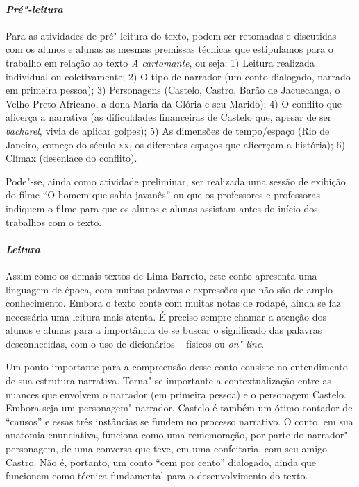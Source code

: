 \documentclass[11pt]{extarticle}
\begin{document}
{{\paragraph{\textit{Pré"-leitura}}

Para as atividades de pré"-leitura do texto, podem ser retomadas e
discutidas com os alunos e alunas as mesmas premissas técnicas que
estipulamos para o trabalho em relação ao texto {\textit{A
cartomante}}, ou seja: 1) Leitura realizada individual ou coletivamente;
2) O tipo de narrador (um conto dialogado, narrado em primeira pessoa);
3) Personagens (Castelo, Castro, Barão de Jacuecanga, o Velho Preto
Africano, a dona Maria da Glória e seu Marido); 4) O conflito que
alicerça a narrativa (as dificuldades financeiras de Castelo que, apesar
de ser \emph{bacharel}, vivia de aplicar golpes); 5) As dimensões de
tempo/espaço (Rio de Janeiro, começo do século \textsc{xx}, os diferentes espaços
que alicerçam a história); 6) Clímax (desenlace do conflito).

Pode"-se, ainda como atividade preliminar, ser realizada uma sessão de
exibição do filme ``O homem que sabia javanês'' ou que os professores e
professoras indiquem o filme para que os alunos e alunas assistam antes
do início dos trabalhos com o texto.

\paragraph{\textit{Leitura}}

Assim como os demais textos de Lima Barreto, este conto apresenta uma
linguagem de época, com muitas palavras e expressões que não são de
amplo conhecimento. Embora o texto conte com muitas notas de rodapé,
ainda se faz necessária uma leitura mais atenta. É preciso sempre chamar
a atenção dos alunos e alunas para a importância de se buscar o
significado das palavras desconhecidas, com o uso de dicionários --
físicos ou ­\emph{on"-line}.

Um ponto importante para a compreensão desse conto consiste no
entendimento de sua estrutura narrativa. Torna"-se importante a
contextualização entre as nuances que envolvem o narrador (em primeira
pessoa) e o personagem Castelo. Embora seja um personagem"-narrador,
Castelo é também um ótimo contador de ``causos'' e essas três instâncias
se fundem no processo narrativo. O conto, em sua anatomia enunciativa,
funciona como uma rememoração, por parte do narrador"-personagem, de uma
conversa que teve, em uma confeitaria, com seu amigo Castro. Não é,
portanto, um conto ``cem por cento'' dialogado, ainda que funcionem 
como técnica fundamental para o desenvolvimento do texto.

}}
\end{document}
